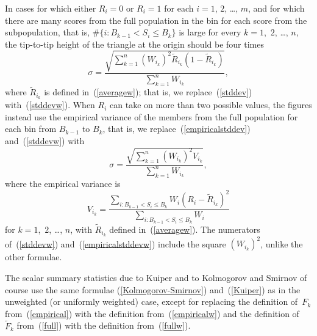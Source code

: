 \documentclass{article}
\begin{document}
In cases for which either $R_i = 0$ or $R_i = 1$
for each $i = 1$, $2$, \dots, $m$,
and for which there are many scores from the full population in the bin
for each score from the subpopulation, that is,
$\#\{i : B_{k-1} < S_i \le B_k\}$ is large for every $k = 1$,~$2$, \dots, $n$,
the tip-to-tip height of the triangle at the origin should be four times
%
\begin{equation}
\label{stddevw}
\sigma
= \frac{\sqrt{\sum_{k=1}^n (W_{i_k})^2 \tilde{R}_{i_k} (1-\tilde{R}_{i_k})}}
       {\sum_{k=1}^n W_{i_k}},
\end{equation}
%
where $\tilde{R}_{i_k}$ is defined in~(\ref{averagew});
that is, we replace~(\ref{stddev}) with~(\ref{stddevw}).
When $R_i$ can take on more than two possible values,
the figures instead use the empirical variance
of the members from the full population for each bin from $B_{k-1}$ to $B_k$,
that is, we replace~(\ref{empiricalstddev}) and~(\ref{stddevw}) with
%
\begin{equation}
\label{empiricalstddevw}
\sigma = \frac{\sqrt{\sum_{k=1}^n (W_{i_k})^2 V_{i_k}}}{\sum_{k=1}^n W_{i_k}},
\end{equation}
%
where the empirical variance is
%
\begin{equation}
\label{varestw}
V_{i_k} = \frac{\sum_{i : B_{k-1} < S_i \le B_k} W_i (R_i - \tilde{R}_{i_k})^2}
               {\sum_{i : B_{k-1} < S_i \le B_k} W_i}
\end{equation}
%
for $k = 1$,~$2$, \dots, $n$,
with $\tilde{R}_{i_k}$ defined in~(\ref{averagew}).
The numerators of~(\ref{stddevw}) and~(\ref{empiricalstddevw})
include the square $(W_{i_k})^2$, unlike the other formulae.

The scalar summary statistics due to Kuiper and to Kolmogorov and Smirnov
of course use the same formulae (\ref{Kolmogorov-Smirnov}) and~(\ref{Kuiper})
as in the unweighted (or uniformly weighted) case,
except for replacing the definition of~$F_k$ from~(\ref{empirical})
with the definition from~(\ref{empiricalw})
and the definition of~$\tilde{F}_k$ from~(\ref{full})
with the definition from~(\ref{fullw}).
\end{document}
